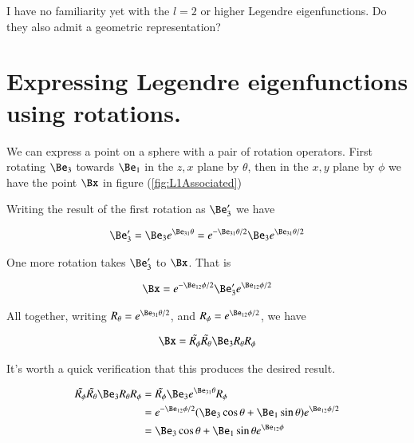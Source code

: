 
I have no familiarity yet with the $l=2$ or higher Legendre eigenfunctions.  Do they also admit a geometric representation?

\section{Expressing Legendre eigenfunctions using rotations.}

We can express a point on a sphere with a pair of rotation operators.  First rotating $\Be_3$ towards $\Be_1$ in the $z,x$ plane by $\theta$, then in the $x,y$ plane by $\phi$ we have the point $\Bx$ in figure (\ref{fig:L1Associated})

Writing the result of the first rotation as $\Be_3'$ we have

\begin{align}\label{eqn:L1Associated:foob1}
\Be_3' = \Be_3 e^{\Be_{31}\theta} = e^{-\Be_{31}\theta/2} \Be_3 e^{\Be_{31}\theta/2} 
\end{align}

One more rotation takes $\Be_3'$ to $\Bx$.  That is

\begin{align}\label{eqn:L1Associated:foob2}
\Bx = e^{-\Be_{12}\phi/2} \Be_3' e^{\Be_{12}\phi/2} 
\end{align}

All together, writing $R_\theta = e^{\Be_{31}\theta/2}$, and $R_\phi = e^{\Be_{12}\phi/2}$, we have

\begin{align}\label{eqn:L1Associated:foob3}
\Bx = \tilde{R_\phi} \tilde{R_\theta} \Be_3 R_\theta R_\phi
\end{align}

It's worth a quick verification that this produces the desired result.

\begin{align*}
\tilde{R_\phi} \tilde{R_\theta} \Be_3 R_\theta R_\phi 
&= \tilde{R_\phi} \Be_3 e^{\Be_{31}\theta} R_\phi \\
&= e^{-\Be_{12}\phi/2} (\Be_3 \cos\theta + \Be_1 \sin\theta) e^{\Be_{12}\phi/2} \\
&= 
\Be_3 \cos\theta + \Be_1 \sin\theta e^{\Be_{12}\phi} \\
\end{align*}

